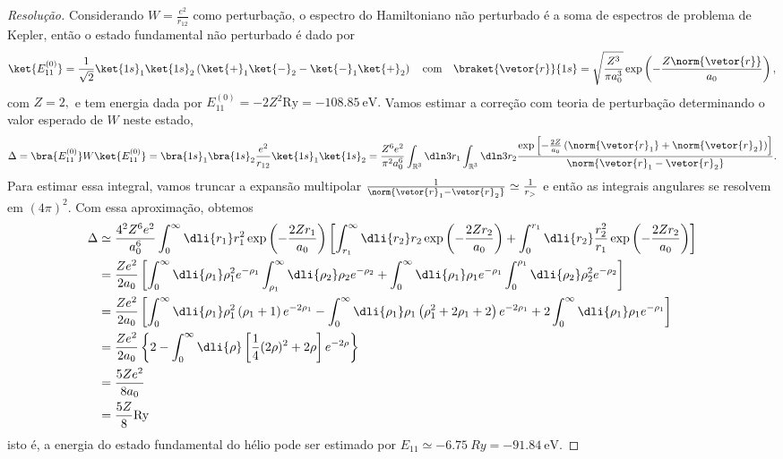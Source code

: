 \begin{proof}[Resolução]
   Considerando \(W = \frac{e^2}{r_{12}}\) como perturbação, o espectro do Hamiltoniano não perturbado é a soma de espectros de problema de Kepler, então o estado fundamental não perturbado é dado por
   \begin{equation*}
      \ket{E_{11}^{(0)}} = \frac1{\sqrt{2}} \ket{1s}_1\ket{1s}_2 \left(\ket{+}_1 \ket{-}_2 - \ket{-}_1\ket{+}_2\right) \quad\text{com}\quad
      \braket{\vetor{r}}{1s} = \sqrt{\frac{Z^3}{\pi a_0^3}} \exp\left(-\frac{Z \norm{\vetor{r}}}{a_0}\right),
   \end{equation*}
   com \(Z = 2,\) e tem energia dada por \(E_{11}^{(0)} = - 2Z^2\mathrm{Ry} = \SI{-108.85}{\eV}.\) Vamos estimar a correção com teoria de perturbação determinando o valor esperado de \(W\) neste estado,
   \begin{equation*}
      \Delta = \bra{E_{11}^{(0)}}W\ket{E_{11}^{(0)}} = \bra{1s}_1\bra{1s}_2\frac{e^2}{r_{12}}\ket{1s}_1 \ket{1s}_2 = \frac{Z^6e^2}{\pi^2 a_0^6}\int_{\mathbb{R}^3} \dln3{r_1}\int_{\mathbb{R}^3}\dln3{r_2} \frac{\exp\left[-\frac{2Z}{a_0}\left(\norm{\vetor{r}_1} + \norm{\vetor{r}_2}\right)\right]}{\norm{\vetor{r}_1 - \vetor{r}_2}}.
   \end{equation*}
   Para estimar essa integral, vamos truncar a expansão multipolar \(\frac{1}{\norm{\vetor{r}_1 - \vetor{r}_2}} \simeq \frac{1}{r_>}\) e então as integrais angulares se resolvem em \((4\pi)^2\). Com essa aproximação, obtemos
   \begin{align*}
      \Delta &\simeq \frac{4^2 Z^6e^2}{a_0^6} \int_{0}^{\infty} \dli{r_1} r_1^2\exp\left(-\frac{2Z r_1}{a_0}\right) \left[\int_{r_1}^{\infty} \dli{r_2} r_2 \exp\left(-\frac{2Zr_2}{a_0}\right) + \int_{0}^{r_1} \dli{r_2} \frac{r^2_2}{r_1} \exp\left(-\frac{2Z r_2}{a_0}\right)\right]\\
             &= \frac{Ze^2}{2a_0} \left[\int_0^\infty \dli{\rho_1} \rho_1^2 e^{-\rho_1} \int_{\rho_1}^\infty \dli{\rho_2} \rho_2 e^{-\rho_2} + \int_0^\infty \dli{\rho_1} \rho_1 e^{-\rho_1} \int_0^{\rho_1} \dli{\rho_2} \rho_2^2 e^{-\rho_2}\right]\\
             &= \frac{Ze^2}{2 a_0}\left[\int_0^\infty \dli{\rho_1} \rho_1^2\left(\rho_1 + 1\right) e^{-2\rho_1} - \int_0^\infty\dli{\rho_1} \rho_1\left(\rho_1^2 + 2\rho_1 + 2\right)e^{-2\rho_1} + 2\int_0^{\infty}\dli{\rho_1} \rho_1 e^{-\rho_1}\right]\\
             &= \frac{Ze^2}{2a_0}\left\{2-\int_0^\infty \dli{\rho} \left[\frac14(2\rho)^2 + 2\rho\right]e^{-2\rho}\right\}\\
             &= \frac{5Ze^2}{8a_0}\\
             &= \frac{5Z}{8} \mathrm{Ry}
   \end{align*}
   isto é, a energia do estado fundamental do hélio pode ser estimado por \(E_{11} \simeq \SI{-6.75}{Ry} = \SI{-91.84}{\eV}.\)
\end{proof}
